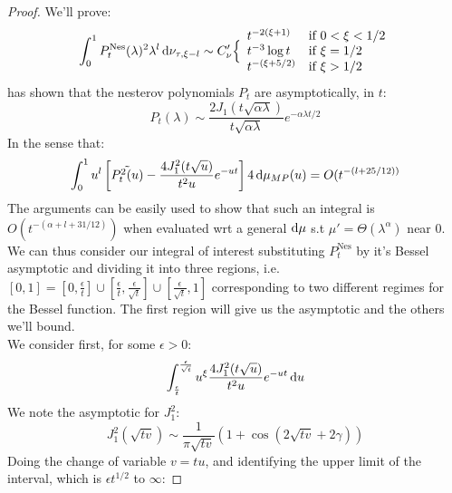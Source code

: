 \documentclass{article}
\begin{document}
\nesterovrates * 


\begin{proof}
We'll prove:
\begin{equation}
    \int_0^1P_t^{\text{Nes}}(\lambda)^2\lambda^l\mathop{}\!\mathrm{d}\nu_{\tau,\xi-l}\sim C'_\nu
    \Big\{\begin{array}{ll}
          t^{-2(\xi+1)}& \mbox{if } 
		  0<\xi<1/2  \\
		  t^{-3}\log t& \mbox{if } 
		  \xi=1/2\\
		  t^{-(\xi+5/2)}& \mbox{if } 
		  \xi>1/2
	\end{array}
\end{equation}
\cite{paquette2020halting} has shown that the nesterov polynomials $P_t$ are asymptotically, in $t$:
\begin{equation}
    P_t(\lambda)\sim\frac{2J_1(t\sqrt{\alpha\lambda})}{t\sqrt{\alpha\lambda}}e^{-\alpha\lambda t/2}
\end{equation}
In the sense that:
\begin{equation}
    \int_0^1u^{l}\left[\Tilde{P_t^2(u)}-\frac{4J_1^2(t\sqrt{u})}{t^2u}e^{-u t}\right]4\mathop{}\!\mathrm{d}\mu_{MP}(u)=O(t^{-(l+25/12))}
\end{equation}
The arguments can be easily used to show that such an integral is $O(t^{ -(\alpha+l+31/12)})$ when evaluated wrt a general $\mathop{}\!\mathrm{d}\mu$ s.t $\mu'=\Theta(\lambda^\alpha)$ near $0$. \\
We can thus consider our integral  of interest substituting $P_t^\text{Nes}$ by it's Bessel asymptotic and dividing it into three regions, i.e. $[0,1]=[0,\frac{\epsilon}{t}]\cup[\frac{\epsilon}{t},\frac{\epsilon}{\sqrt{t}}]\cup[\frac{\epsilon}{\sqrt{t}},1]$ corresponding to two different regimes for the Bessel function. The first region will give us the asymptotic and the others we'll bound.\\
We consider first, for some $\epsilon>0$:
\begin{equation}
    \int_{\frac{\epsilon}{t}}^{\frac{\epsilon}{\sqrt{t}}} u^{\xi}\frac{4J_1^2(t\sqrt{u})}{t^2u}e^{-u t}\mathop{}\!\mathrm{d} u
\end{equation}
We note the asymptotic for $J_1^2$:
\begin{equation}
    J_1^2(\sqrt{tv}) \sim \frac{1}{\pi\sqrt{tv}}(1+\cos(2\sqrt{tv}+2\gamma))
\end{equation}
Doing the change of variable $v=tu$, and identifying the upper limit of the interval, which is $\epsilon t^{1/2}$ to $\infty$:


\end{proof}
\end{document}

